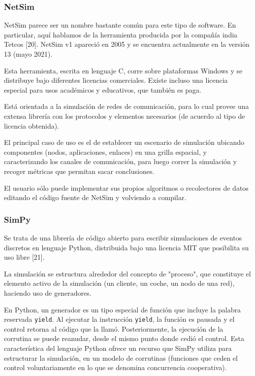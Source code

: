 \documentclass[]{article}
\begin{document}
\subsubsection{NetSim}

NetSim parece ser un nombre bastante común para este tipo de software. En
particular, aquí hablamos de la herramienta producida por la compañía india
Tetcos [20]. NetSim v1 apareció en 2005 y se encuentra actualmente en la
versión 13 (mayo 2021).

Esta herramienta, escrita en lenguaje C, corre sobre plataformas Windows y se
distribuye bajo diferentes licencias comerciales. Existe incluso una licencia
especial para usos académicos y educativos, que también es paga.

Está orientada a la simulación de redes de comunicación, para lo cual provee
una extensa librería con los protocolos y elementos necesarios (de acuerdo al
tipo de licencia obtenida).

El principal caso de uso es el de establecer un escenario de simulación
ubicando componentes (nodos, aplicaciones, enlaces) en una grilla espacial, y
caracterizando los canales de comunicación, para luego correr la simulación y
recoger métricas que permitan sacar conclusiones.

El usuario sólo puede implementar sus propios algoritmos o recolectores de
datos editando el código fuente de NetSim y volviendo a compilar.

\subsubsection{SimPy}

Se trata de una librería de código abierto para escribir simulaciones de
eventos discretos en lenguaje Python, distribuida bajo una licencia MIT que
posibilita su uso libre [21].

La simulación se estructura alrededor del concepto de "proceso", que constituye
el elemento activo de la simulación (un cliente, un coche, un nodo de una red),
haciendo uso de generadores.

En Python, un generador es un tipo especial de función que incluye la palabra
reservada \verb!yield!. Al ejecutar la instrucción \verb!yield!, la función es
pausada y el control retorna al código que la llamó. Posteriormente, la
ejecución de la corrutina se puede reanudar, desde el mismo punto donde cedió
el control. Esta característica del lenguaje Python ofrece un recurso que SimPy
utiliza para estructurar la simulación, en un modelo de corrutinas (funciones
que ceden el control voluntariamente en lo que se denomina concurrencia
cooperativa).
\end{document}
